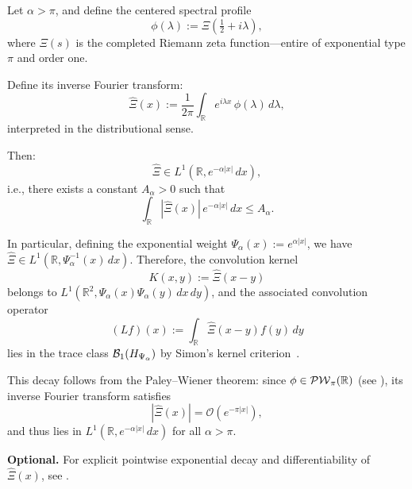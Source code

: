 \begin{lemma}
\label{lem:weighted_L1_inverse_FT_xi}
Let \( \alpha > \pi \), and define the centered spectral profile
\[
\phi(\lambda) := \Xi\left( \tfrac{1}{2} + i\lambda \right),
\]
where \( \Xi(s) \) is the completed Riemann zeta function—entire of exponential type \( \pi \) and order one.

Define its inverse Fourier transform:
\[
\widehat{\Xi}(x) := \frac{1}{2\pi} \int_{\mathbb{R}} e^{i\lambda x} \, \phi(\lambda)\, d\lambda,
\]
interpreted in the distributional sense.

Then:
\[
\widehat{\Xi} \in L^1(\mathbb{R}, e^{-\alpha |x|}\, dx),
\]
i.e., there exists a constant \( A_\alpha > 0 \) such that
\[
\int_{\mathbb{R}} |\widehat{\Xi}(x)| \, e^{-\alpha |x|}\, dx \le A_\alpha.
\]

\medskip
\noindent
In particular, defining the exponential weight \( \Psi_\alpha(x) := e^{\alpha |x|} \), we have \( \widehat{\Xi} \in L^1(\mathbb{R}, \Psi_\alpha^{-1}(x)\, dx) \). Therefore, the convolution kernel
\[
K(x,y) := \widehat{\Xi}(x - y)
\]
belongs to \( L^1(\mathbb{R}^2, \Psi_\alpha(x)\Psi_\alpha(y)\, dx\,dy) \), and the associated convolution operator
\[
(L f)(x) := \int_{\mathbb{R}} \widehat{\Xi}(x - y) f(y)\, dy
\]
lies in the trace class \( \mathcal{B}_1(H_{\Psi_\alpha}) \) by Simon’s kernel criterion~\cite[Thm.~4.2]{Simon2005TraceIdeals}.

\medskip
\noindent
This decay follows from the Paley--Wiener theorem: since \( \phi \in \mathcal{PW}_{\pi}(\mathbb{R}) \) (see ), its inverse Fourier transform satisfies
\[
|\widehat{\Xi}(x)| = \mathcal{O}(e^{-\pi |x|}),
\]
and thus lies in \( L^1(\mathbb{R}, e^{-\alpha |x|}\, dx) \) for all \( \alpha > \pi \).

\medskip
\noindent
\textbf{Optional.} For explicit pointwise exponential decay and differentiability of \( \widehat{\Xi}(x) \), see .
\end{lemma}
